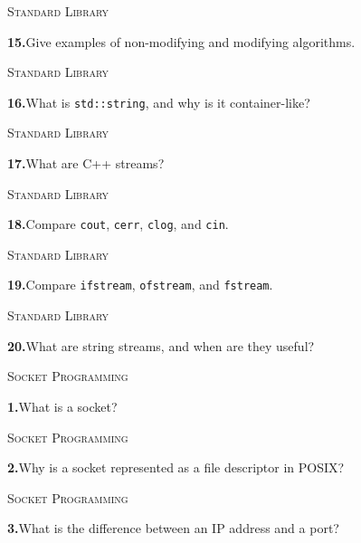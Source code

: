 \documentclass[11pt,a4paper]{article}
\newenvironment{questionblock}{%
  \begin{minipage}[t][0.455\textheight][t]{\textwidth}%
  \raggedright\small
}{%
  \vfill
  \end{minipage}%
}
\newcommand{\sectionlabel}[1]{\textsc{#1}\par\vspace{0.35em}}
\newcommand{\questionnumber}[1]{\textbf{#1.}\enspace}
\begin{document}
\vspace*{0.04\textheight}
\begin{questionblock}
\sectionlabel{Standard Library}
\questionnumber{15}Give examples of non-modifying and modifying algorithms.\par
\end{questionblock}
\newpage
\begin{questionblock}
\sectionlabel{Standard Library}
\questionnumber{16}What is \verb|std::string|, and why is it container-like?\par
\end{questionblock}
\vspace*{0.04\textheight}
\begin{questionblock}
\sectionlabel{Standard Library}
\questionnumber{17}What are C++ streams?\par
\end{questionblock}
\newpage
\begin{questionblock}
\sectionlabel{Standard Library}
\questionnumber{18}Compare \verb|cout|, \verb|cerr|, \verb|clog|, and \verb|cin|.\par
\end{questionblock}
\vspace*{0.04\textheight}
\begin{questionblock}
\sectionlabel{Standard Library}
\questionnumber{19}Compare \verb|ifstream|, \verb|ofstream|, and \verb|fstream|.\par
\end{questionblock}
\newpage
\begin{questionblock}
\sectionlabel{Standard Library}
\questionnumber{20}What are string streams, and when are they useful?\par

\end{questionblock}
\vspace*{0.04\textheight}
\begin{questionblock}
\sectionlabel{Socket Programming}
\questionnumber{1}What is a socket?\par
\end{questionblock}
\newpage
\begin{questionblock}
\sectionlabel{Socket Programming}
\questionnumber{2}Why is a socket represented as a file descriptor in POSIX?\par
\end{questionblock}
\vspace*{0.04\textheight}
\begin{questionblock}
\sectionlabel{Socket Programming}
\questionnumber{3}What is the difference between an IP address and a port?\par
\end{questionblock}
\end{document}
